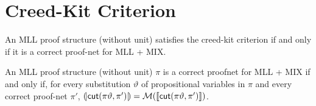 \section{Creed-Kit Criterion}


\begin{theorem}
    An MLL proof structure (without unit) satisfies the creed-kit criterion if and only if it is a correct proof-net for MLL + MIX.
\end{theorem}


\begin{theorem}
    An MLL proof structure (without unit) \( \pi \) is a correct proofnet for MLL + MIX if and only if, for every substitution \( \vartheta \) of propositional variables in \( \pi \) and every correct proof-net \( \pi' \), \( (\!|{\mathsf{cut}(\pi\vartheta, \pi')}|\!) = \mathcal{M}({\llbracket{\mathsf{cut}(\pi\vartheta, \pi')}\rrbracket}) \). 
\end{theorem}

